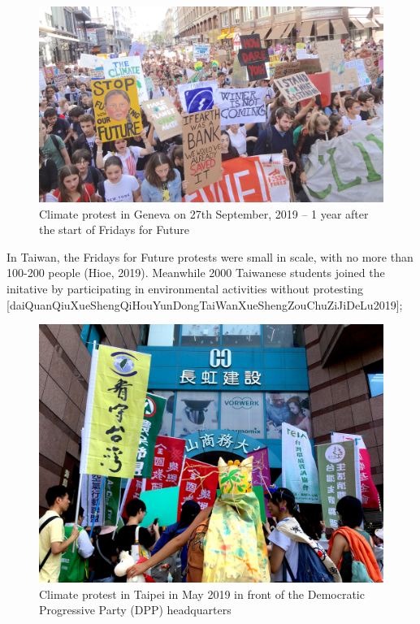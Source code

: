 \documentclass[
  letterpaper,
  DIV=11,
  numbers=noendperiod]{scrartcl}
\begin{document}
\begin{figure}[H]

{\centering \includegraphics[width=1\textwidth,height=\textheight]{./images/college/geneve.jpg}

}

\caption{Climate protest in Geneva on 27th September, 2019 -- 1 year
after the start of Fridays for Future}

\end{figure}%

In Taiwan, the Fridays for Future protests were small in scale, with no
more than 100-200 people (Hioe, 2019). Meanwhile 2000 Taiwanese students
joined the initative by participating in environmental activities
without protesting
{[}daiQuanQiuXueShengQiHouYunDongTaiWanXueShengZouChuZiJiDeLu2019{]};

\begin{figure}[H]

{\centering \includegraphics[width=1\textwidth,height=\textheight]{./images/college/taipei.jpg}

}

\caption{Climate protest in Taipei in May 2019 in front of the
Democratic Progressive Party (DPP) headquarters}

\end{figure}%
\end{document}
